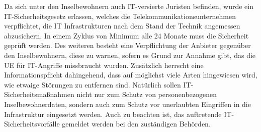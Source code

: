 Da sich unter den Inselbewohnern auch IT-versierte Juristen befinden, wurde ein IT-Sicherheitsgesetz erlassen, welches die Telekommunikationsunternehmen verpflichtet, die IT Infrastrukturen nach dem Stand der Technik angemessen abzusichern. In einem Zyklus von Minimum alle 24 Monate muss die Sicherheit geprüft werden.
Des weiteren besteht eine Verpflichtung der Anbieter gegenüber den Inselbewohnern, diese zu warnen, sofern es Grund zur Annahme gibt, das die UE für IT-Angriffe missbraucht wurden. Zusätzlich herrscht eine Informationspflicht dahingehend, dass auf möglichst viele Arten hingewiesen wird, wie etwaige Störungen zu entfernen sind.
Natürlich sollen IT-Sicherheitsmaßnahmen nicht nur zum Schutz von personenbezogenen Inselbewohnerdaten, sondern auch zum Schutz vor unerlaubten Eingriffen in die Infrastruktur eingesetzt werden.
Auch zu beachten ist, das auftretende IT-Sicherheitsvorfälle gemeldet werden bei den zuständigen Behörden.\cite{BSI17}  